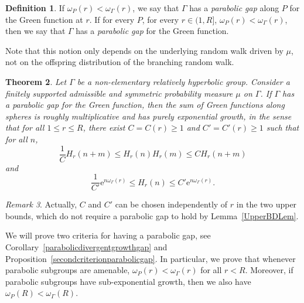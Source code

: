 \documentclass{amsart}
\newcommand{\showcomments}{yes}
\newenvironment{comment}%
{\ifthenelse{\equal{\showcomments}{yes}}%
{\footnotemark
    \begin{lrbox}{\commentbox}
    \begin{minipage}[t]{1.25in}\raggedright\sffamily\upshape\tiny
    \footnotemark[\arabic{footnote}]}%
{\begin{lrbox}{\commentbox}}}%
{\ifthenelse{\equal{\showcomments}{yes}}%
{\end{minipage}\end{lrbox}\marginpar{\usebox{\commentbox}}}%
{\end{lrbox}}}
\newtheorem{thm}{Theorem}[section]
\theoremstyle{definition}
\newtheorem{defn}[thm]{Definition}
\theoremstyle{remark}
\newtheorem{rem}[thm]{Remark}
\newcommand{\lw}[1]{{\color{cyan}{#1}}}
\newcommand{\ywy}[1]{{\color{red}{#1}}}
\begin{document}
\begin{defn}
If $\omega_P(r)<\omega_\Gamma(r)$, we say that $\Gamma$ has a \textit{parabolic gap} along $P$ for the Green function at $r$.
If for every $P$, for every $r\in (1,R]$, $\omega_P(r)<\omega_\Gamma(r)$, then we say that $\Gamma$ has a \textit{parabolic gap} for the Green function.
\end{defn}

Note that this notion only depends on the underlying random walk driven by $\mu$, not on the offspring distribution of the branching random walk.

\begin{thm}\label{mainthmparabolicgap}
Let $\Gamma$ be a non-elementary relatively hyperbolic group.
Consider a finitely supported admissible and symmetric probability measure $\mu$ on $\Gamma$.
If $\Gamma$ has a parabolic gap for the Green function,
then the sum of Green functions along spheres is roughly multiplicative and has purely exponential growth, in the sense that for all $1\leq r\leq R$, there exist $C=C(r)\geq 1$ and $C'=C'(r)\geq 1$
such that for all $n$,
$$\frac{1}{C}H_{r} (n+m)\leq  H_r(n)H_r(m)\le C H_{r} (n+m)
$$
and
$$\frac{1}{C'}\mathrm{e}^{n\omega_\Gamma(r)}\leq H_r(n)\leq C' \mathrm{e}^{n\omega_\Gamma(r)}.$$
\end{thm}

\begin{rem}
Actually, $C$ and $C'$ can be chosen independently of $r$ in the two upper bounds, which do not require a parabolic gap to hold by Lemma~\ref{UpperBDLem}.
\end{rem}


We will prove two criteria for having a parabolic gap, see Corollary~\ref{parabolicdivergentgrowthgap} and Proposition~\ref{secondcriterionparabolicgap}.
In particular, we   prove that whenever parabolic subgroups are amenable, $\omega_P(r)<\omega_\Gamma(r)$ for all $r<R$.
Moreover, if parabolic subgroups have sub-exponential growth, then we also have $\omega_P(R)<\omega_\Gamma(R)$.
\end{document}
